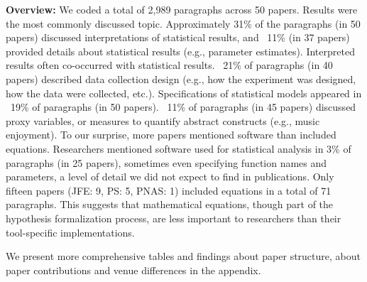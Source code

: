 \noindent\textbf{Overview:} We coded a total of 2,989 paragraphs across 50 papers. Results were the most
commonly discussed topic. Approximately 31\% of the paragraphs (in 50 papers)
discussed interpretations of statistical results, and ~11\% (in 37 papers)
provided details about statistical results (e.g., parameter estimates).
Interpreted results often co-occurred with statistical results. ~21\% of
paragraphs (in 40 papers) described data collection design (e.g., how the
experiment was designed, how the data were collected, etc.). Specifications of
statistical models appeared in ~19\% of paragraphs (in 50 papers). ~11\% of
paragraphs (in 45 papers) discussed proxy variables, or measures to quantify
abstract constructs (e.g., music enjoyment). To our surprise, more papers
mentioned software than included equations. Researchers mentioned software used
for statistical analysis in 3\% of paragraphs (in 25 papers), sometimes even
specifying function names and parameters, a level of detail we did not expect to
find in publications. Only fifteen papers (JFE: 9, PS: 5, PNAS: 1) included
equations in a total of 71 paragraphs. This suggests that mathematical
equations, though part of the hypothesis formalization process, are less
important to researchers than their tool-specific implementations.


We present more comprehensive tables and findings about paper structure, about paper
contributions and venue differences in the appendix.



